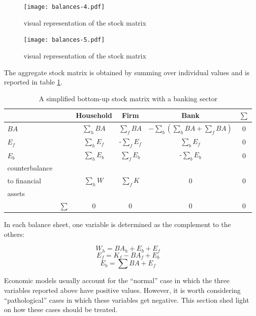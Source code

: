 \documentclass{article}
\begin{document}
\begin{figure}[ht]
\hskip-3cm
\texttt{[image: balances-4.pdf]}
	\caption{visual representation of the stock matrix}
	\label{fig:vstock4}
\end{figure}
\fi

\begin{figure}[ht]
\hskip-3cm
\texttt{[image: balances-5.pdf]}
	\caption{visual representation of the stock matrix}
	\label{fig:vstock5}
\end{figure}



\clearpage
The aggregate stock matrix is obtained by summing over individual values and is reported in table \ref{table:simplified}.

\begin{table}[htp]
\begin{center}
\begin{tabular}{l c c c c c}
	\hline
&	& Household 	& \parbox{1.5cm}{\centerline{Firm}}   & \parbox{1.5cm}{\centerline{Bank}} &$\sum$\\
\hline
\hline
$BA$	&	&$\sum_h BA$	&$\sum_f BA$	&$-\sum_b (\sum_h BA+\sum_f BA)$	&0\\
$E_f$	&	&$\sum_h E_f$	&-$\sum_f E_f$	&$\sum_b E_f$	&0\\
$E_b$	&	&$\sum_h E_b$	&$\sum_f E_b$	&-$\sum_b E_b$	&0\\
	\hline
counterbalance	&&		&	&	&\\
to financial	&&	$\sum_hW$	&$\sum_fK$	&0	&0\\
assets	&&		&	&	&\\
	\hline
	\hline
&$\sum$	&	0	&0	&0	&0\\
\end{tabular}
\end{center}
\caption{A simplified bottom-up stock matrix with a banking sector}
\label{table:simplified}
\end{table}



In each balance sheet, one variable is determined as the complement to the others:

\[
W_h=BA_h+E_b+E_f
\]
\[
E_f=K_f-BA_f+E_b
\]
\[
E_b=\sum BA+E_f
\]

Economic models usually account for the ``normal'' case in which the three variables reported above have positive values. However, it is worth considering ``pathological'' cases in which these variables get negative. This section shed light on how these cases should be treated.  
\end{document}
